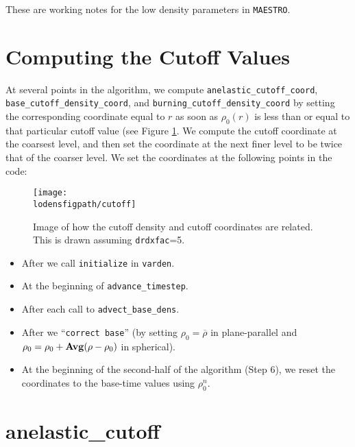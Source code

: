 These are working notes for the low density parameters in {\tt MAESTRO}.

\section{Computing the Cutoff Values}

At several points in the algorithm, we compute {\tt anelastic\_cutoff\_coord}, 
{\tt base\_cutoff\_density\_coord}, and {\tt burning\_cutoff\_density\_coord} by 
setting the corresponding coordinate equal to $r$ as soon as $\rho_0(r)$ is less than 
or equal to that particular cutoff value (see Figure \ref{Fig:Cutoff}.
We compute the cutoff coordinate at the
coarsest level, and then set the coordinate at the next finer level to be twice that
of the coarser level.  We set the coordinates at the following points in the code:
\begin{figure}[hpb]
\centering
\texttt{[image: \\lodensfigpath/cutoff]}\hspace{0.2in}
\begin{minipage}[b]{5.0in}
\caption{Image of how the cutoff density and cutoff coordinates
are related.  This is drawn assuming {\tt drdxfac}=5.\vspace{2em}}
\end{minipage}
\label{Fig:Cutoff}
\end{figure}

\begin{itemize}

\item After we call {\tt initialize} in {\tt varden}.

\item At the beginning of {\tt advance\_timestep}.

\item After each call to {\tt advect\_base\_dens}.

\item After we ``{\tt correct base}'' (by setting $\rho_0 = \overline{\rho}$ in
  plane-parallel and $\rho_0 = \rho_0 + {\bf{Avg}}(\rho - \rho_0)$ in spherical).

\item At the beginning of the second-half of the algorithm (Step 6), we reset
  the coordinates to the base-time values using $\rho_0^n$.

\end{itemize}

\section{anelastic\_cutoff}\label{Sec:Anelastic Cutoff}

